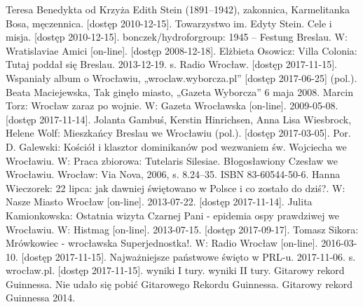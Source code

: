 \documentclass{article}
\begin{document}
{ Teresa Benedykta od Krzyża Edith Stein (1891–1942), zakonnica, Karmelitanka Bosa, męczennica. [dostęp 2010-12-15].
 Towarzystwo im. Edyty Stein. Cele i misja. [dostęp 2010-12-15].
 bonczek/hydroforgroup: 1945 – Festung Breslau. W: Wratislaviae Amici [on-line]. [dostęp 2008-12-18].
 Elżbieta Osowicz: Villa Colonia: Tutaj poddał się Breslau. 2013-12-19. s. Radio Wrocław. [dostęp 2017-11-15].
 Wspaniały album o Wrocławiu, „wroclaw.wyborcza.pl” [dostęp 2017-06-25] (pol.).
 Beata Maciejewska, Tak ginęło miasto, „Gazeta Wyborcza” 6 maja 2008.
 Marcin Torz: Wrocław zaraz po wojnie. W: Gazeta Wrocławska [on-line]. 2009-05-08. [dostęp 2017-11-14].
 Jolanta Gambuś, Kerstin Hinrichsen, Anna Lisa Wiesbrock, Helene Wolf: Mieszkańcy Breslau we Wrocławiu (pol.). [dostęp 2017-03-05].
 Por. D. Galewski: Kościół i klasztor dominikanów pod wezwaniem św. Wojciecha we Wrocławiu. W: Praca zbiorowa: Tutelaris Silesiae. Błogosławiony Czesław we Wrocławiu. Wrocław: Via Nova, 2006, s. 8.24–35. ISBN 83-60544-50-6.
 Hanna Wieczorek: 22 lipca: jak dawniej świętowano w Polsce i co zostało do dziś?. W: Nasze Miasto Wrocław [on-line]. 2013-07-22. [dostęp 2017-11-14].
 Julita Kamionkowska: Ostatnia wizyta Czarnej Pani - epidemia ospy prawdziwej we Wrocławiu. W: Histmag [on-line]. 2013-07-15. [dostęp 2017-09-17].
 Tomasz Sikora: Mrówkowiec - wrocławska Superjednostka!. W: Radio Wrocław [on-line]. 2016-03-10. [dostęp 2017-11-15].
 Najważniejsze państwowe święto w PRL-u. 2017-11-06. s. wrocław.pl. [dostęp 2017-11-15].
 wyniki I tury.
 wyniki II tury.
 Gitarowy rekord Guinnessa.
 Nie udało się pobić Gitarowego Rekordu Guinnessa.
 Gitarowy rekord Guinnessa 2014.}
\end{document}
